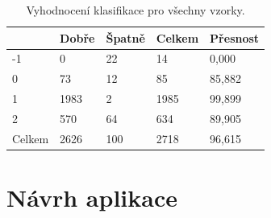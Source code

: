 \documentclass[11pt,twoside,a4paper,table]{book}
\begin{document}
\begin{table}[h]
\begin{center}
\begin{tabular}{lllll}
\rowcolor[HTML]{9B9B9B} 
\multicolumn{1}{|l|}{\cellcolor[HTML]{9B9B9B}Třída} & \multicolumn{1}{l|}{\cellcolor[HTML]{9B9B9B}Dobře} & \multicolumn{1}{l|}{\cellcolor[HTML]{9B9B9B}Špatně}  & \multicolumn{1}{l|}{\cellcolor[HTML]{9B9B9B}Celkem} & \multicolumn{1}{l|}{\cellcolor[HTML]{9B9B9B}Přesnost} \\ \hline
\multicolumn{1}{|l|}{-1}                            & \multicolumn{1}{l|}{0}                             & \multicolumn{1}{l|}{22}                              & \multicolumn{1}{l|}{14}                             & \multicolumn{1}{l|}{0,000}                            \\ \hline
\multicolumn{1}{|l|}{0}                             & \multicolumn{1}{l|}{73}                            & \multicolumn{1}{l|}{12}                              & \multicolumn{1}{l|}{85}                             & \multicolumn{1}{l|}{85,882}                           \\ \hline
\multicolumn{1}{|l|}{1}                             & \multicolumn{1}{l|}{1983}                          & \multicolumn{1}{l|}{2}                               & \multicolumn{1}{l|}{1985}                           & \multicolumn{1}{l|}{99,899}                           \\ \hline
\multicolumn{1}{|l|}{2}                             & \multicolumn{1}{l|}{570}                           & \multicolumn{1}{l|}{64}                              & \multicolumn{1}{l|}{634}                            & \multicolumn{1}{l|}{89,905}                           \\ \hline
Celkem                                              & 2626                                               & 100                                                  & 2718                                                & 96,615                                                \\ \hline
\end{tabular}
\end{center}
\caption{Vyhodnocení klasifikace pro všechny vzorky. }
\label{tab:classresult8}
\end{table}

\chapter{Návrh aplikace}
\end{document}
